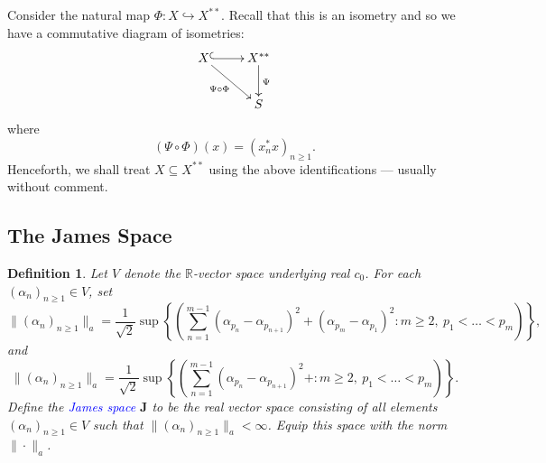 \documentclass[11pt]{article}
\theoremstyle{thmstyle}
\theoremstyle{defstyle}
\newtheorem{definition}[theorem]{Definition}
\newcommand{\R}{\mathbb{R}}
\newcommand{\into}{\hookrightarrow}
\newcommand{\define}[1]{\textcolor{blue}{\textit{#1}}}
\renewcommand{\ge}{\geqslant}
\newcommand{\bfJ}{\mathbf{J}}
\begin{document}
Consider the natural map $\Phi\colon X\into X^{\ast\ast}$. Recall that this is an isometry and so we have a commutative diagram of isometries: 
\begin{equation*}
	\xymatrix {
		X\ar@{^{(}->}[r]\ar[rd]_{\Psi\circ\Phi} & X^{\ast\ast}\ar[d]^\Psi\\
		& S
	}
\end{equation*}
where 
\begin{equation*}
	\left(\Psi\circ\Phi\right)(x) = \left(x_n^\ast x\right)_{n\ge 1}.
\end{equation*}
Henceforth, we shall treat $X\subseteq X^{\ast\ast}$ using the above identifications --- usually without comment. 

\subsection*{The James Space}

\begin{definition}
	Let $V$ denote the $\R$-vector space underlying real $c_0$. For each $(\alpha_n)_{n\ge 1}\in V$, set 
	\begin{equation*}
		\|(\alpha_n)_{n\ge 1}\|_a = \frac{1}{\sqrt 2}\sup\left\{\left(\sum_{n = 1}^{m - 1}(\alpha_{p_n} - \alpha_{p_{n + 1}})^2 + (\alpha_{p_m} - \alpha_{p_1})^2\colon m\ge 2,~p_1 < \dots < p_m\right)\right\},
	\end{equation*}
	and 
	\begin{equation*}
		\|(\alpha_n)_{n\ge 1}\|_a = \frac{1}{\sqrt 2}\sup\left\{\left(\sum_{n = 1}^{m - 1}(\alpha_{p_n} - \alpha_{p_{n + 1}})^2 + \colon m\ge 2,~p_1 < \dots < p_m\right)\right\}.
	\end{equation*}
	Define the \define{James space} $\bfJ$ to be the real vector space consisting of all elements $(\alpha_n)_{n\ge 1}\in V$ such that $\|(\alpha_n)_{n\ge 1}\|_a < \infty$. Equip this space with the norm $\|\cdot\|_a$.
\end{definition}
\end{document}

